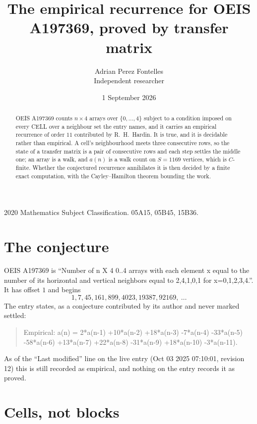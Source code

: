 \documentclass[11pt,a4paper]{article}
\title{The empirical recurrence for OEIS A197369, proved by transfer matrix}
\author{Adrian Perez Fontelles\\ \small Independent researcher}
\date{1 September 2026}
\theoremstyle{plain}
\theoremstyle{definition}
\begin{document}
\maketitle

\begin{abstract}
OEIS A197369 counts $n\times4$ arrays over $\{0,\dots,4\}$ subject to a condition imposed on
every CELL over a neighbour set the entry names, and it carries an empirical recurrence of
order $11$ contributed by R.~H.~Hardin. It is true, and it is decidable rather than
empirical. A cell's neighbourhood meets three consecutive rows, so the state of a transfer
matrix is a pair of consecutive rows and each step settles the middle one; an array is a
walk, and $a(n)$ is a walk count on $S=1169$ vertices, which is $C$-finite. Whether the
conjectured recurrence annihilates it is then decided by a finite exact computation, with the
Cayley--Hamilton theorem bounding the work.
\end{abstract}

\noindent\small 2020 Mathematics Subject Classification. 05A15, 05B45, 15B36.\normalsize

\section{The conjecture}

OEIS A197369 is ``Number of n X 4 0..4 arrays with each element x equal to the number of its horizontal and vertical neighbors equal to 2,4,1,0,1 for x=0,1,2,3,4.''. It has offset $1$ and begins
\[
1, 7, 45, 161, 899, 4023, 19387, 92169,\ \dots
\]
The entry states, as a conjecture contributed by its author and never marked settled:
\begin{quote}
Empirical: a(n) = 2*a(n-1) +10*a(n-2) +18*a(n-3) -7*a(n-4) -33*a(n-5) -58*a(n-6) +13*a(n-7) +22*a(n-8) -31*a(n-9) +18*a(n-10) -3*a(n-11).
\end{quote}
As of the ``Last modified'' line on the live entry (Oct 03 2025 07:10:01, revision 12) this is still
recorded as empirical, and nothing on the entry records it as proved.

\section{Cells, not blocks}
\end{document}
